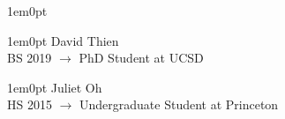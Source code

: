 \documentclass[11pt,letterpaper]{article}
\newcommand{\cvSection}[1]{\vspace{1em}{\Large #1}}
\newcommand{\cvSectionIndent}[0]{1em}
\newcommand{\cvSubSection}[1]{\vspace{0.1em}{\large #1}}
\newcommand{\cvSubSectionIndent}[0]{1em}
\begin{document}
\begin{adjustwidth}{\cvSectionIndent}{0pt}
\begin{adjustwidth}{\cvSubSectionIndent}{0pt}
    David Thien \\
    BS 2019 $\rightarrow$ PhD Student at UCSD \\
  \end{adjustwidth}

  \cvSubSection{High School}
  \begin{adjustwidth}{\cvSubSectionIndent}{0pt}
    Juliet Oh \\
    HS 2015 $\rightarrow$ Undergraduate Student at Princeton \\
  \end{adjustwidth}

\end{adjustwidth}

\cvSection{Publications}

\cvSection{Teaching}
\end{document}
